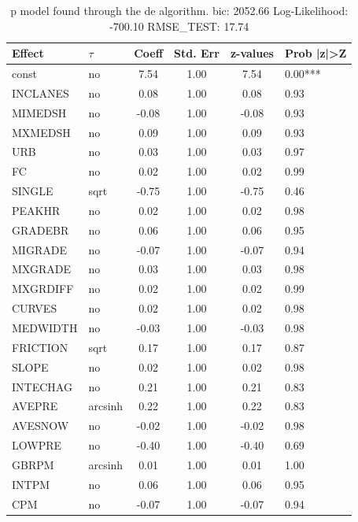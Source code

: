 \begin{table}
	\caption{p model found through the de algorithm. bic: 2052.66 Log-Likelihood: -700.10 RMSE_TEST: 17.74}
	\begin{center}
		\begin{tabular}{|l|l|c|c|c|l|}
			\hline
			Effect & $\tau$ & Coeff & Std. Err & z-values & Prob |z|>Z \\
			\hline
			const & no & 7.54 & 1.00 & 7.54 & 0.00*** \\
			\hline
			INCLANES & no & 0.08 & 1.00 & 0.08 & 0.93 \\
			\hline
			MIMEDSH & no & -0.08 & 1.00 & -0.08 & 0.93 \\
			\hline
			MXMEDSH & no & 0.09 & 1.00 & 0.09 & 0.93 \\
			\hline
			URB & no & 0.03 & 1.00 & 0.03 & 0.97 \\
			\hline
			FC & no & 0.02 & 1.00 & 0.02 & 0.99 \\
			\hline
			SINGLE & sqrt & -0.75 & 1.00 & -0.75 & 0.46 \\
			\hline
			PEAKHR & no & 0.02 & 1.00 & 0.02 & 0.98 \\
			\hline
			GRADEBR & no & 0.06 & 1.00 & 0.06 & 0.95 \\
			\hline
			MIGRADE & no & -0.07 & 1.00 & -0.07 & 0.94 \\
			\hline
			MXGRADE & no & 0.03 & 1.00 & 0.03 & 0.98 \\
			\hline
			MXGRDIFF & no & 0.02 & 1.00 & 0.02 & 0.99 \\
			\hline
			CURVES & no & 0.02 & 1.00 & 0.02 & 0.98 \\
			\hline
			MEDWIDTH & no & -0.03 & 1.00 & -0.03 & 0.98 \\
			\hline
			FRICTION & sqrt & 0.17 & 1.00 & 0.17 & 0.87 \\
			\hline
			SLOPE & no & 0.02 & 1.00 & 0.02 & 0.98 \\
			\hline
			INTECHAG & no & 0.21 & 1.00 & 0.21 & 0.83 \\
			\hline
			AVEPRE & arcsinh & 0.22 & 1.00 & 0.22 & 0.83 \\
			\hline
			AVESNOW & no & -0.02 & 1.00 & -0.02 & 0.98 \\
			\hline
			LOWPRE & no & -0.40 & 1.00 & -0.40 & 0.69 \\
			\hline
			GBRPM & arcsinh & 0.01 & 1.00 & 0.01 & 1.00 \\
			\hline
			INTPM & no & 0.06 & 1.00 & 0.06 & 0.95 \\
			\hline
			CPM & no & -0.07 & 1.00 & -0.07 & 0.94 \\

\end{tabular}
\end{center}
\end{table}
